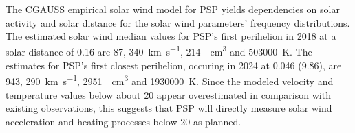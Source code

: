 {The CGAUSS empirical solar wind model for PSP yields dependencies on solar activity and solar distance for the solar wind parameters' frequency distributions. The estimated solar wind median values for PSP’s first perihelion in 2018 at a solar distance of \SI{0.16}{\au} are \SI{87}{\nT}, \SI{340}{\km\per\s}, \SI{214}{\per\cm\cubed} and \SI{503000}{\K}. The estimates for PSP’s first closest perihelion, occuring in 2024 at \SI{0.046}{\au} (\SI{9.86}{\Rs}), are \SI{943}{\nT}, \SI{290}{\km\per\s}, \SI{2951}{\per\cm\cubed} and \SI{1930000}{\K}. Since the modeled velocity and temperature values below about \SI{20}{\Rs} appear overestimated in comparison with existing observations, this suggests that PSP will directly measure solar wind acceleration and heating processes below \SI{20}{\Rs} as planned.}	%
{}	%


\maketitle





